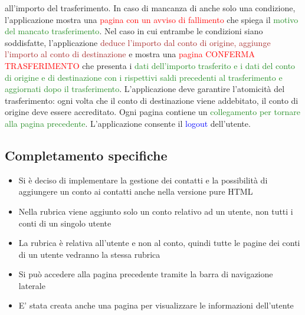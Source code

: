 \documentclass{article}
\begin{document}
all’importo del trasferimento. In caso di mancanza di anche solo una condizione, l’applicazione
mostra una \textcolor{red}{pagina con un avviso di fallimento} che spiega il \textcolor{ForestGreen}{motivo del mancato trasferimento}.
Nel caso in cui entrambe le condizioni siano soddisfatte, l’applicazione \textcolor{brown}{deduce l’importo dal
conto di origine, aggiunge l’importo al conto di destinazione} e mostra una \textcolor{red}{pagina CONFERMA
TRASFERIMENTO} che presenta i \textcolor{ForestGreen}{dati dell’importo trasferito e i dati del conto di origine e di
destinazione con i rispettivi saldi precedenti al trasferimento e aggiornati dopo il trasferimento}.
L’applicazione deve garantire l’atomicità del trasferimento: ogni volta che il conto di
destinazione viene addebitato, il conto di origine deve essere accreditato. Ogni pagina
contiene un \textcolor{ForestGreen}{collegamento per tornare alla pagina precedente}. L’applicazione consente il
\textcolor{blue}{logout} dell’utente.

\subsection{Completamento specifiche}
\begin{itemize}
\item Si è deciso di implementare la gestione dei contatti e la possibilità di aggiungere un conto ai contatti anche nella versione pure HTML
\item Nella rubrica viene aggiunto solo un conto relativo ad un utente, non tutti i conti di un singolo utente
\item La rubrica è relativa all'utente e non al conto, quindi tutte le pagine dei conti di un utente vedranno la stessa rubrica
\item Si può accedere alla pagina precedente tramite la barra di navigazione laterale
\item E' stata creata anche una pagina per visualizzare le informazioni dell'utente
\end{itemize}
\end{document}
